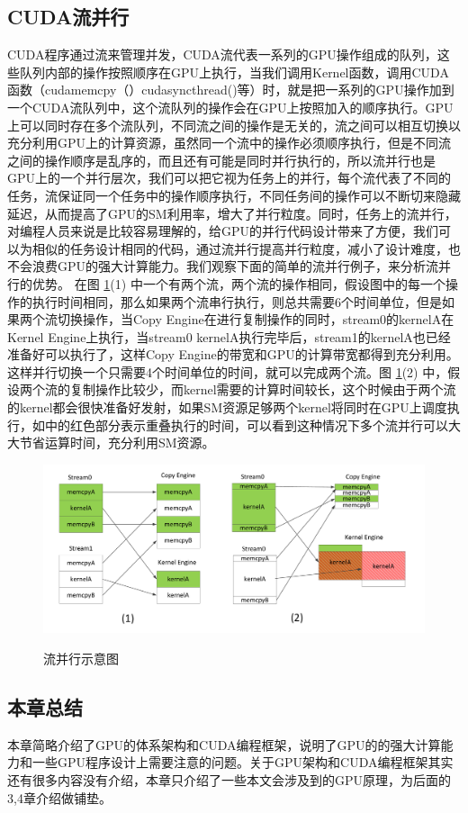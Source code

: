 \subsection{CUDA流并行}
CUDA程序通过流来管理并发，CUDA流代表一系列的GPU操作组成的队列，这些队列内部的操作按照顺序在GPU上执行，当我们调用Kernel函数，调用CUDA函数（cudamemcpy（）cudasyncthread()等）时，就是把一系列的GPU操作加到一个CUDA流队列中，这个流队列的操作会在GPU上按照加入的顺序执行。GPU上可以同时存在多个流队列，不同流之间的操作是无关的，流之间可以相互切换以充分利用GPU上的计算资源，虽然同一个流中的操作必须顺序执行，但是不同流之间的操作顺序是乱序的，而且还有可能是同时并行执行的，所以流并行也是GPU上的一个并行层次，我们可以把它视为任务上的并行，每个流代表了不同的任务，流保证同一个任务中的操作顺序执行，不同任务间的操作可以不断切来隐藏延迟，从而提高了GPU的SM利用率，增大了并行粒度。同时，任务上的流并行，对编程人员来说是比较容易理解的，给GPU的并行代码设计带来了方便，我们可以为相似的任务设计相同的代码，通过流并行提高并行粒度，减小了设计难度，也不会浪费GPU的强大计算能力。我们观察下面的简单的流并行例子，来分析流并行的优势。
在图 \ref{flow}(1) 中一个有两个流，两个流的操作相同，假设图中的每一个操作的执行时间相同，那么如果两个流串行执行，则总共需要6个时间单位，但是如果两个流切换操作，当Copy Engine在进行复制操作的同时，stream0的kernelA在Kernel Engine上执行，当stream0 kernelA执行完毕后，stream1的kernelA也已经准备好可以执行了，这样Copy Engine的带宽和GPU的计算带宽都得到充分利用。这样并行切换一个只需要4个时间单位的时间，就可以完成两个流。图 \ref{flow}(2) 中，假设两个流的复制操作比较少，而kernel需要的计算时间较长，这个时候由于两个流的kernel都会很快准备好发射，如果SM资源足够两个kernel将同时在GPU上调度执行，如中的红色部分表示重叠执行的时间，可以看到这种情况下多个流并行可以大大节省运算时间，充分利用SM资源。
\begin{figure}
\setlength{\belowcaptionskip}{-0.5cm}
\begin{center}
{\includegraphics[width=1 \textwidth]{figures/flow.pdf}}
\end{center}
\caption{{\footnotesize{流并行示意图}}}
\label{flow}
\end{figure}
\subsection{本章总结}
本章简略介绍了GPU的体系架构和CUDA编程框架，说明了GPU的的强大计算能力和一些GPU程序设计上需要注意的问题。关于GPU架构和CUDA编程框架其实还有很多内容没有介绍，本章只介绍了一些本文会涉及到的GPU原理，为后面的3,4章介绍做铺垫。
